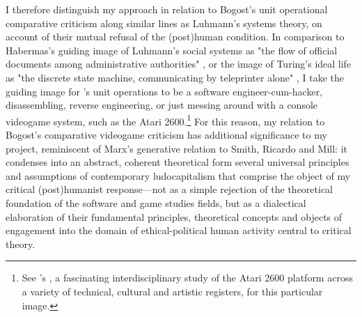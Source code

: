 I therefore distinguish my approach in relation to Bogost's unit operational comparative criticism along similar lines as Luhmann's systems theory, on account of their mutual refusal of the (post)human condition. In comparison to Habermas's guiding image of Luhmann's social systems as "the flow of official documents among administrative authorities" \autocite[378]{Habermas1987-yd}, or the image of Turing's ideal life as "the discrete state machine, communicating by teleprinter alone" \autocite[Hodges, qtd. in][xii]{Hayles1999-de}, I take the guiding image for \citeauthor{Bogost2006-ec}'s unit operations  to be a software engineer-cum-hacker, disassembling, reverse engineering, or just messing around with a console videogame system, such as the Atari 2600.\footnote{
  See \citeauthor{Montfort-rtb}'s , a fascinating interdisciplinary study of the Atari 2600 platform across a variety of technical, cultural and artistic registers, for this particular image.
} For this reason, my relation to Bogost's comparative videogame criticism has additional significance to my project, reminiscent of Marx's generative relation to Smith, Ricardo and Mill: it condenses into an abstract, coherent theoretical form several universal principles and assumptions of contemporary ludocapitalism that comprise the object of my critical (post)humanist response---not as a simple rejection of the theoretical foundation of the software and game studies fields, but as a dialectical elaboration of their fundamental principles, theoretical concepts and objects of engagement into the domain of ethical-political human activity central to critical theory.

